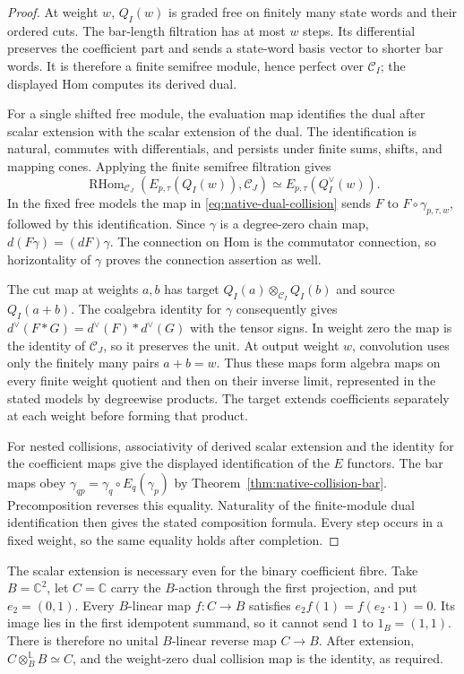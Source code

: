 \begin{proof}
At weight $w$, $Q_I(w)$ is graded free on finitely many state
words and their ordered cuts. The bar-length filtration has at
most $w$ steps. Its differential preserves the coefficient part
and sends a state-word basis vector to shorter bar words.
It is therefore a finite semifree module, hence perfect over
$\mathcal C_I$; the displayed Hom computes its derived dual.

For a single shifted free module, the evaluation map identifies
the dual after scalar extension with the scalar extension of the
dual. The identification is natural, commutes with differentials,
and persists under finite sums, shifts, and mapping cones.
Applying the finite semifree filtration gives
\[
 \operatorname{RHom}_{\mathcal C_J}
       (E_{p,\tau}(Q_I(w)),\mathcal C_J)
 \simeq E_{p,\tau}(Q_I^\vee(w)).
\]
In the fixed free models the map in
\eqref{eq:native-dual-collision} sends $F$ to
$F\circ\gamma_{p,\tau,w}$, followed by this identification.
Since $\gamma$ is a degree-zero chain map,
$d(F\gamma)=(dF)\gamma$. The connection on Hom is the
commutator connection, so horizontality of $\gamma$ proves the
connection assertion as well.

The cut map at weights $a,b$ has target
$Q_I(a)\otimes_{\mathcal C_I}Q_I(b)$ and source $Q_I(a+b)$.
The coalgebra identity for $\gamma$ consequently gives
$d^\vee(F*G)=d^\vee(F)*d^\vee(G)$ with the tensor signs.
In weight zero the map is the identity of $\mathcal C_J$, so it
preserves the unit. At output weight $w$, convolution uses only
the finitely many pairs $a+b=w$. Thus these maps form algebra
maps on every finite weight quotient and then on their inverse
limit, represented in the stated models by degreewise products.
The target extends coefficients separately at each weight before
forming that product.

For nested collisions, associativity of derived scalar extension
and the identity for the coefficient maps give the displayed
identification of the $E$ functors. The bar maps obey
$\gamma_{qp}=\gamma_q\circ E_q(\gamma_p)$ by
Theorem~\ref{thm:native-collision-bar}. Precomposition reverses
this equality. Naturality of the finite-module dual identification
then gives the stated composition formula. Every step occurs in
a fixed weight, so the same equality holds after completion.
\end{proof}

The scalar extension is necessary even for the binary coefficient
fibre. Take $B=\mathbb C^2$, let $C=\mathbb C$ carry the
$B$-action through the first projection, and put $e_2=(0,1)$.
Every $B$-linear map $f:C\to B$ satisfies
$e_2f(1)=f(e_2\cdot1)=0$. Its image lies in the first idempotent
summand, so it cannot send $1$ to $1_B=(1,1)$.
There is therefore no unital $B$-linear reverse map $C\to B$.
After extension, $C\otimes_B^{\mathbb L}B\simeq C$, and the
weight-zero dual collision map is the identity, as required.

